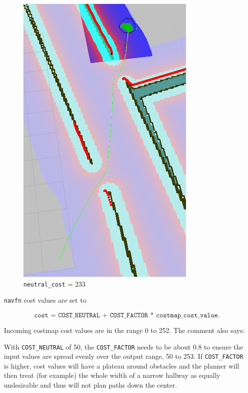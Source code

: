 \documentclass[12pt]{article}
\begin{document}
\begin{figure}[!htb]
\endminipage\hfill
{}
  \includegraphics[width=\linewidth]{NC_hi.png}
  \caption{\texttt{neutral\_cost} = 233}
\endminipage\hfill
\end{figure}

\newpage


\texttt{navfn} cost values are set to

$$\texttt{cost = COST\_NEUTRAL + COST\_FACTOR * costmap\_cost\_value.}$$

Incoming costmap cost values are in the range 0 to 252. The comment also says:
\begin{displayquote}
    With \texttt{COST\_NEUTRAL} of 50, the \texttt{COST\_FACTOR} needs to be about 0.8 to
    ensure the input values are spread evenly over the output range, 50
    to 253.  If \texttt{COST\_FACTOR} is higher, cost values will have a plateau
    around obstacles and the planner will then treat (for example) the
    whole width of a narrow hallway as equally undesirable and thus
    will not plan paths down the center.
\end{displayquote}
\end{document}
